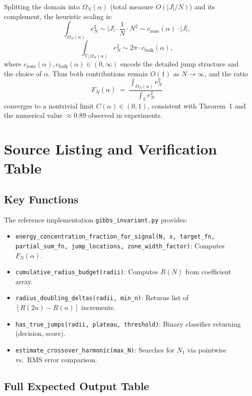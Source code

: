 \documentclass[11pt,letterpaper]{article}
\theoremstyle{remark}
\newcommand{\Torus}{\mathbb{T}}
\begin{document}
Splitting the domain into $\Omega_N(\alpha)$ (total measure $O(|J|/N)$) and its complement, the heuristic scaling is:
\[
\int_{\Omega_N(\alpha)} e_N^2 \sim |J| \cdot \frac{1}{N} \cdot N^2 \sim c_{\text{zone}}(\alpha) \cdot |J|,
\]
\[
\int_{\Torus \setminus \Omega_N(\alpha)} e_N^2 \sim 2\pi \cdot c_{\text{bulk}}(\alpha),
\]
where $c_{\text{zone}}(\alpha), c_{\text{bulk}}(\alpha) \in (0,\infty)$ encode the detailed jump structure and the choice of $\alpha$. Thus both contributions remain $O(1)$ as $N \to \infty$, and the ratio
\[
F_N(\alpha) \;=\; \frac{\int_{\Omega_N(\alpha)} e_N^2}{\int_{\Torus} e_N^2}
\]
converges to a nontrivial limit $C(\alpha) \in (0,1)$, consistent with Theorem~1 and the numerical value $\approx 0.89$ observed in experiments.

\section{Source Listing and Verification Table}

\subsection{Key Functions}

The reference implementation \texttt{gibbs\_invariant.py} provides:
\begin{itemize}[nosep]
\item \texttt{energy\_concentration\_fraction\_for\_signal(N, x, target\_fn, partial\_sum\_fn, jump\_locations, zone\_width\_factor)}: Computes $F_N(\alpha)$.
\item \texttt{cumulative\_radius\_budget(radii)}: Computes $R(N)$ from coefficient array.
\item \texttt{radius\_doubling\_deltas(radii, min\_n)}: Returns list of $[R(2n) - R(n)]$ increments.
\item \texttt{has\_true\_jumps(radii, plateau, threshold)}: Binary classifier returning (decision, score).
\item \texttt{estimate\_crossover\_harmonic(max\_N)}: Searches for $N_1$ via pointwise vs.~RMS error comparison.
\end{itemize}

\subsection{Full Expected Output Table}
\end{document}

